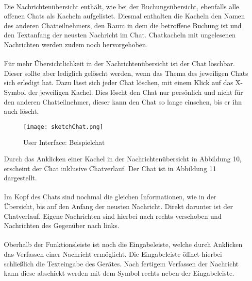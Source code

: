 \paragraph{} Die Nachrichtenübersicht enthält, wie bei der Buchungsübersicht, ebenfalls alle offenen Chats als Kacheln aufgelistet. 
Diesmal enthalten die Kacheln den Namen des anderen Chatteilnehmers, den Raum in dem die betroffene Buchung ist und den Textanfang der neusten Nachricht im Chat.
Chatkacheln mit ungelesenen Nachrichten werden zudem noch hervorgehoben.

\paragraph{} Für mehr Übersichtlichkeit in der Nachrichtenübersicht ist der Chat löschbar.
Dieser sollte aber lediglich gelöscht werden, wenn das Thema des jeweiligen Chats sich erledigt hat.
Dazu lässt sich jeder Chat löschen, mit einem Klick auf das X-Symbol der jeweiligen Kachel.
Dies löscht den Chat nur persönlich und nicht für den anderen Chatteilnehmer, dieser kann den Chat so lange einsehen, bis er ihn auch löscht.

\newpage
\begin{wrapfigure}[15]{r}{5.5cm}
  \texttt{[image: sketchChat.png]}
  \caption{User Interface: Beispielchat}
\end{wrapfigure}

Durch das Anklicken einer Kachel in der Nachrichtenübersicht in Abbildung 10, erscheint der Chat inklusive Chatverlauf.
Der Chat ist in Abbildung 11 dargestellt.

\paragraph{} Im Kopf des Chats sind nochmal die gleichen Informationen, wie in der Übersicht, bis auf den Anfang der neusten Nachricht. 
Direkt darunter ist der Chatverlauf.
Eigene Nachrichten sind hierbei nach rechts verschoben und Nachrichten des Gegenüber nach links.

\paragraph{} Oberhalb der Funktionsleiste ist noch die Eingabeleiste, welche durch Anklicken das Verfassen einer Nachricht ermöglicht. 
Die Eingabeleiste öffnet hierbei schließlich die Texteingabe des Gerätes.
Nach fertigem Verfassen der Nachricht kann diese abschickt werden mit dem Symbol rechts neben der Eingabeleiste. 


